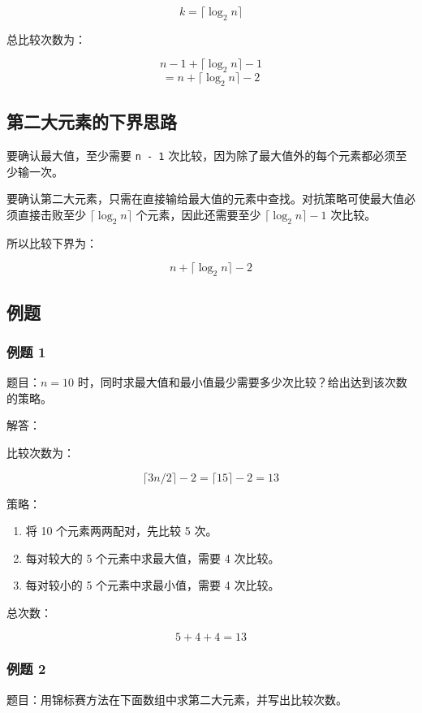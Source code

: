 \documentclass[UTF8,zihao=-4]{ctexart}
\begin{document}
\[k = \lceil \log_2 n \rceil\]

总比较次数为：

\[n - 1 + \lceil \log_2 n \rceil - 1\]
\[= n + \lceil \log_2 n \rceil - 2\]

\subsection*{第二大元素的下界思路}

要确认最大值，至少需要 \texttt{n - 1} 次比较，因为除了最大值外的每个元素都必须至少输一次。

要确认第二大元素，只需在直接输给最大值的元素中查找。对抗策略可使最大值必须直接击败至少 $\lceil \log_2 n \rceil$ 个元素，因此还需要至少 $\lceil \log_2 n \rceil - 1$ 次比较。

所以比较下界为：

\[n + \lceil \log_2 n \rceil - 2\]

\subsection*{例题}

\subsubsection*{例题 1}

题目：$n = 10$ 时，同时求最大值和最小值最少需要多少次比较？给出达到该次数的策略。

解答：

比较次数为：

\[\lceil 3n/2 \rceil - 2 = \lceil 15 \rceil - 2 = 13\]

策略：

\begin{enumerate}
\item 将 10 个元素两两配对，先比较 5 次。
\item 每对较大的 5 个元素中求最大值，需要 4 次比较。
\item 每对较小的 5 个元素中求最小值，需要 4 次比较。
\end{enumerate}

总次数：

\[5 + 4 + 4 = 13\]

\subsubsection*{例题 2}

题目：用锦标赛方法在下面数组中求第二大元素，并写出比较次数。
\end{document}
